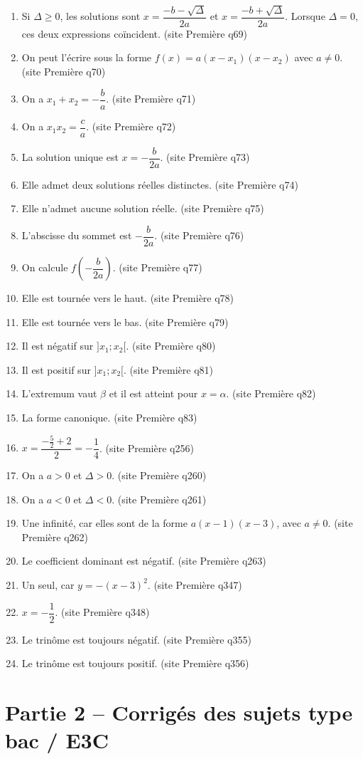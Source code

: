 \documentclass[11pt,a4paper]{article}
\newcommand{\sourceq}[1]{ {\scriptsize\textcolor{bleufonce}{(site Première q#1)}}}
\newcounter{reponse}
\newenvironment{blocreponses}[1]{%
  \begin{tcolorbox}[enhanced,breakable,colback=bleuclair,colframe=bleufonce,boxrule=0.6pt,arc=2mm,left=2mm,right=2mm,top=2mm,bottom=1.5mm,title={\bfseries #1},coltitle=white,colbacktitle=bleufonce,before skip=3mm,after skip=3mm, fontupper=\large]
  \large
  \begin{enumerate}[leftmargin=*,label=\textbf{\arabic*.},itemsep=0.45em,topsep=0.5em]
  \setcounter{enumi}{\value{reponse}}
}{%
  \setcounter{reponse}{\value{enumi}}
  \end{enumerate}
  \end{tcolorbox}
}
\begin{document}
\begin{blocreponses}{Réponses -- Questions flash second degré}
  \item Si $\Delta\geq 0$, les solutions sont $x=\dfrac{-b-\sqrt{\Delta}}{2a}$ et $x=\dfrac{-b+\sqrt{\Delta}}{2a}$. Lorsque $\Delta=0$, ces deux expressions coïncident. \sourceq{69}
  \item On peut l’écrire sous la forme $f(x)=a(x-x_1)(x-x_2)$ avec $a\neq 0$. \sourceq{70}
  \item On a $x_1+x_2=-\dfrac{b}{a}$. \sourceq{71}
  \item On a $x_1x_2=\dfrac{c}{a}$. \sourceq{72}
  \item La solution unique est $x=-\dfrac{b}{2a}$. \sourceq{73}
  \item Elle admet deux solutions réelles distinctes. \sourceq{74}
  \item Elle n’admet aucune solution réelle. \sourceq{75}
  \item L’abscisse du sommet est $-\dfrac{b}{2a}$. \sourceq{76}
  \item On calcule $f\left(-\dfrac{b}{2a}\right)$. \sourceq{77}
  \item Elle est tournée vers le haut. \sourceq{78}
  \item Elle est tournée vers le bas. \sourceq{79}
  \item Il est négatif sur $]x_1;x_2[$. \sourceq{80}
  \item Il est positif sur $]x_1;x_2[$. \sourceq{81}
  \item L’extremum vaut $\beta$ et il est atteint pour $x=\alpha$. \sourceq{82}
  \item La forme canonique. \sourceq{83}
  \item $x=\dfrac{-\frac52+2}{2}=-\dfrac14$. \sourceq{256}
  \item On a $a>0$ et $\Delta>0$. \sourceq{260}
  \item On a $a<0$ et $\Delta<0$. \sourceq{261}
  \item Une infinité, car elles sont de la forme $a(x-1)(x-3)$, avec $a\neq0$. \sourceq{262}
  \item Le coefficient dominant est négatif. \sourceq{263}
  \item Un seul, car $y=-(x-3)^2$. \sourceq{347}
  \item $x=-\dfrac12$. \sourceq{348}
  \item Le trinôme est toujours négatif. \sourceq{355}
  \item Le trinôme est toujours positif. \sourceq{356}
\end{blocreponses}


\clearpage
\section*{Partie 2 -- Corrigés des sujets type bac / E3C}
\end{document}
